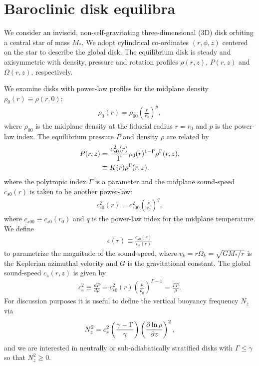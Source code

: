 \section{Baroclinic disk equilibra}
We consider  an inviscid, non-self-gravitating three-dimensional (3D)
disk orbiting a central star of mass $M_*$. 
We adopt cylindrical
co-ordinates $(r,\phi, z)$ centered on the star to describe the global
disk. The equilibrium disk is steady and axisymmetric with density,
pressure and rotation profiles $\rho(r,z)$, $P(r,z)$ and
$\Omega(r,z)$, respectively. 

We examine disks with power-law profiles for the midplane density
$\rho_0(r)\equiv\rho(r,0)$: 
\begin{align}
  \rho_0(r) = \rho_{00}\left(\frac{r}{r_0}\right)^p,
\end{align}
where $\rho_{00}$ is the midplane density at the fiducial radius
$r=r_0$ and $p$ is the power-law index. The equilibrium pressure $P$
and density $\rho$ are related by 
\begin{align}
  P(r,z) &= 
  \frac{c_{s0}^2(r)}{\Gamma}\rho_0(r)^{1-\Gamma}\rho^\Gamma(r,z),\notag\\
  & \equiv K(r)\rho^{\Gamma}(r,z). \label{eqm_press}
\end{align}
where the polytropic index $\Gamma$ is a parameter and 
the midplane sound-speed $c_{s0}(r)$ is taken to be another power-law: 
\begin{align}
  c_{s0}^2(r)=c_{s00}^2\left(\frac{r}{r_0}\right)^q, 
\end{align}
where $c_{s00}\equiv c_{s0}(r_0)$  and $q$ is the power-law index for
the midplane temperature. We define
\begin{align}
  \epsilon(r) \equiv \frac{c_{s0}(r)}{v_k(r)}
\end{align}
to parametrize the magnitude of the sound-speed, where
$v_k=r\Omega_k=\sqrt{GM_*/r}$ is the Keplerian azimuthal velocity and
$G$ is the gravitational constant. 
The global sound-speed $c_s(r,z)$ is given by
\begin{align}
  c_s^2\equiv \frac{dP}{d\rho} =
  c_{s0}^2(r)\left(\frac{\rho}{\rho_0}\right)^{\Gamma-1} = \frac{\Gamma P}{\rho}. 
\end{align}
For discussion purposes it is useful to define the vertical buoyancy frequency $N_z$ via
\begin{align}
  N_z^2 = c_s^2 \left(\frac{\gamma -
      \Gamma}{\gamma}\right)\left(\frac{\partial\ln\rho}{\partial z}\right)^2,   
\end{align}
and we are interested in neutrally or sub-adiabatically stratified
disks with $\Gamma\leq \gamma$ so that $N_z^2\geq0$.  



